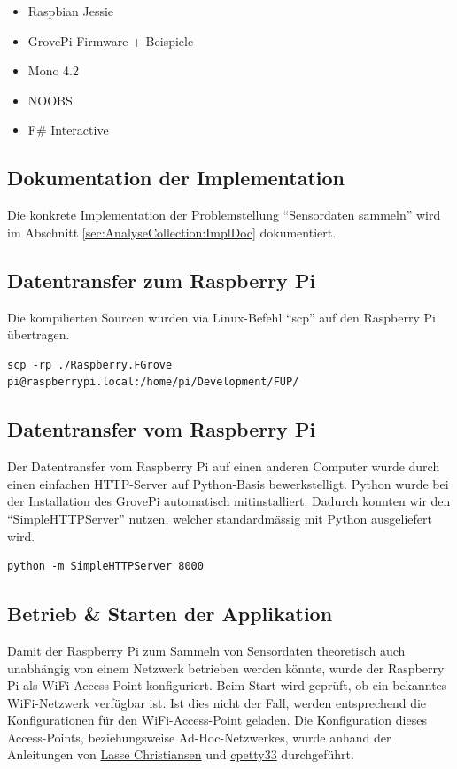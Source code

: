 \begin{itemize}
\item Raspbian Jessie
\item GrovePi Firmware + Beispiele
\item Mono 4.2
\item NOOBS
\item F\# Interactive
\end{itemize}

\subsection{Dokumentation der Implementation}
Die konkrete Implementation der Problemstellung "`Sensordaten sammeln"' wird im Abschnitt \ref{sec:AnalyseCollection:ImplDoc}  dokumentiert.

\subsection{Datentransfer zum Raspberry Pi}
Die kompilierten Sourcen wurden via Linux-Befehl "`scp"' auf den Raspberry Pi übertragen.

\begin{lstlisting}
scp -rp ./Raspberry.FGrove pi@raspberrypi.local:/home/pi/Development/FUP/
\end{lstlisting}

\subsection{Datentransfer vom Raspberry Pi}
Der Datentransfer vom Raspberry Pi auf einen anderen Computer wurde durch einen einfachen HTTP-Server auf Python-Basis bewerkstelligt. Python wurde bei der Installation des GrovePi automatisch mitinstalliert. Dadurch konnten wir den "`SimpleHTTPServer"' nutzen, welcher standardmässig mit Python ausgeliefert wird.

\begin{lstlisting}
python -m SimpleHTTPServer 8000
\end{lstlisting}


\subsection{Betrieb \& Starten der Applikation}
Damit der Raspberry Pi zum Sammeln von Sensordaten theoretisch auch unabhängig von einem Netzwerk betrieben werden könnte, wurde der Raspberry Pi als WiFi-Access-Point konfiguriert. Beim Start wird geprüft, ob ein bekanntes WiFi-Netzwerk verfügbar ist. Ist dies nicht der Fall, werden entsprechend die Konfigurationen für den WiFi-Access-Point geladen. Die Konfiguration dieses Access-Points, beziehungsweise Ad-Hoc-Netzwerkes, wurde anhand der Anleitungen von \hyperlink{http://lcdev.dk/2012/11/18/raspberry-pi-tutorial-connect-to-wifi-or-create-an-encrypted-dhcp-enabled-ad-hoc-network-as-fallback/}{Lasse Christiansen} und \hyperlink{http://slicepi.com/creating-an-ad-hoc-network-for-your-raspberry-pi/}{cpetty33} durchgeführt.


